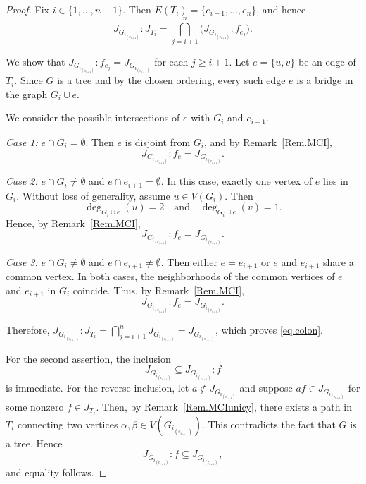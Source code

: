 \documentclass[11pt,a4paper,reqno]{amsart}
\theoremstyle{definition}
\begin{document}
\begin{proof}
Fix \(i\in\{1,\ldots,n-1\}\). Then \(E(T_i)=\{e_{i+1},\ldots,e_n\}\), and hence
\[
J_{G_{i_{(e_{i+1})}}}:J_{T_i}
=
\bigcap_{j=i+1}^{n} \big( J_{G_{i_{(e_{i+1})}}} : f_{e_j} \big).
\]

We show that \(J_{G_{i_{(e_{i+1})}}} : f_{e_j} = J_{G_{i_{(e_{i+1})}}}\) for each \(j \ge i+1\).  
Let \(e=\{u,v\}\) be an edge of \(T_i\). Since \(G\) is a tree and by the chosen ordering, every such edge \(e\) is a bridge in the graph \(G_i \cup e\).

We consider the possible intersections of \(e\) with \(G_i\) and \(e_{i+1}\).

\medskip

\noindent
\textit{Case 1:} \(e \cap G_i = \emptyset\).  
Then \(e\) is disjoint from \(G_i\), and by Remark~\ref{Rem.MCI},
\[
J_{G_{i_{(e_{i+1})}}} : f_e = J_{G_{i_{(e_{i+1})}}}.
\]

\medskip

\noindent
\textit{Case 2:} \(e \cap G_i \neq \emptyset\) and \(e \cap e_{i+1} = \emptyset\).  
In this case, exactly one vertex of \(e\) lies in \(G_i\). Without loss of generality, assume \(u \in V(G_i)\). Then
\[
\deg_{G_i \cup e}(u)=2 \quad \text{and} \quad \deg_{G_i \cup e}(v)=1.
\]
Hence, by Remark~\ref{Rem.MCI},
\[
J_{G_{i_{(e_{i+1})}}} : f_e = J_{G_{i_{(e_{i+1})}}}.
\]

\medskip

\noindent
\textit{Case 3:} \(e \cap G_i \neq \emptyset\) and \(e \cap e_{i+1} \neq \emptyset\).  
Then either \(e=e_{i+1}\) or \(e\) and \(e_{i+1}\) share a common vertex. In both cases, the neighborhoods of the common vertices of \(e\) and \(e_{i+1}\) in \(G_i\) coincide. Thus, by Remark~\ref{Rem.MCI},
\[
J_{G_{i_{(e_{i+1})}}} : f_e = J_{G_{i_{(e_{i+1})}}}.
\]

\medskip

Therefore, $J_{G_{i_{(e_{i+1})}}}:J_{T_i} = \bigcap_{j=i+1}^{n} J_{G_{i_{(e_{i+1})}}} = J_{G_{i_{(e_{i+1})}}}$, which proves \eqref{eq.colon}.

\medskip

For the second assertion, the inclusion
\[
J_{G_{i_{(e_{i+1})}}} \subseteq J_{G_{i_{(e_{i+1})}}}:f
\]
is immediate. For the reverse inclusion, let \(a \notin J_{G_{i_{(e_{i+1})}}}\) and suppose \(af \in J_{G_{i_{(e_{i+1})}}}\) for some nonzero \(f \in J_{T_i}\). Then, by Remark~\ref{Rem.MCIunicy}, there exists a path in \(T_i\) connecting two vertices \(\alpha,\beta \in V(G_{i_{(e_{i+1})}})\). This contradicts the fact that \(G\) is a tree. Hence
\[
J_{G_{i_{(e_{i+1})}}}:f \subseteq J_{G_{i_{(e_{i+1})}}},
\]
and equality follows.
\end{proof}
\end{document}

